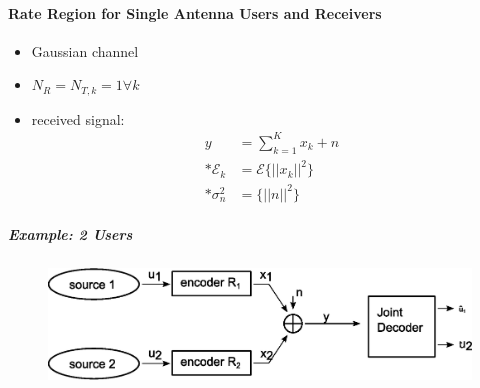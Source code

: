 \documentclass[a4paper, 10pt]{article}
\begin{document}
\paragraph{Rate Region for Single Antenna Users and Receivers}
\begin{itemize}
	\item Gaussian channel
	\item $N_R = N_{T,k} = 1 \forall	k $
	\item received signal: 
	\begin{align*}
		y &= \sum\limits_{k = 1}^{K}x_k + n\\ * \mathcal{E}_k &= \mathcal{E}\bigl\{||x_k||^2\bigr\} \\ *\sigma_n^2 &= \bigl\{||n||^2\bigr\}
	\end{align*}
\end{itemize}
\subparagraph*{Example: 2 Users}
\begin{figure}[h]\centering
	\includegraphics[scale=0.6]{Rate_Region_Example}
\end{figure}
\end{document}
